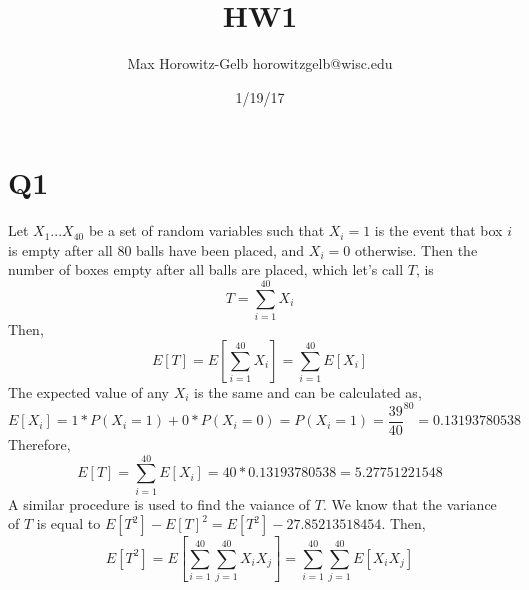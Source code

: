 \documentclass{article}
\title{HW1}
\author{Max Horowitz-Gelb horowitzgelb@wisc.edu}
\date{1/19/17}
\begin{document}
\maketitle
\section*{Q1}
Let $X_1 ... X_40$ be a set of random variables such that $X_i = 1$ is the event that box $i$ is empty
after all $80$ balls have been placed, and $X_i = 0$ otherwise.
Then the number of boxes empty after all balls are placed, which let's call $T$, is 
\[
T = \sum_{i=1}^{40} X_i
\]
Then,
\[
E[T] = E[\sum_{i=1}^{40} X_i] = \sum_{i=1}^{40} E[X_i]
\]
The expected value of any $X_i$ is the same and can be calculated as,
\[
E[X_i] = 1*P(X_i = 1) + 0 * P(X_i = 0) = P(X_i = 1) = \frac{39}{40}^{80} = 0.13193780538
\]
Therefore,
\[
E[T] = \sum_{i=1}^{40} E[X_i] = 40 * 0.13193780538 = 5.27751221548
\]
A similar procedure is used to find the vaiance of $T$.
We know that the variance of $T$ is equal to $E[T^2] - E[T]^2 = E[T^2] - 27.85213518454$.
Then,
\[
E[T^2] = E[ \sum_{i=1}^{40}\sum_{j=1}^{40}X_i X_j] = \sum_{i=1}^{40}\sum_{j=1}^{40}E[X_i X_j]
\]
\end{document}

